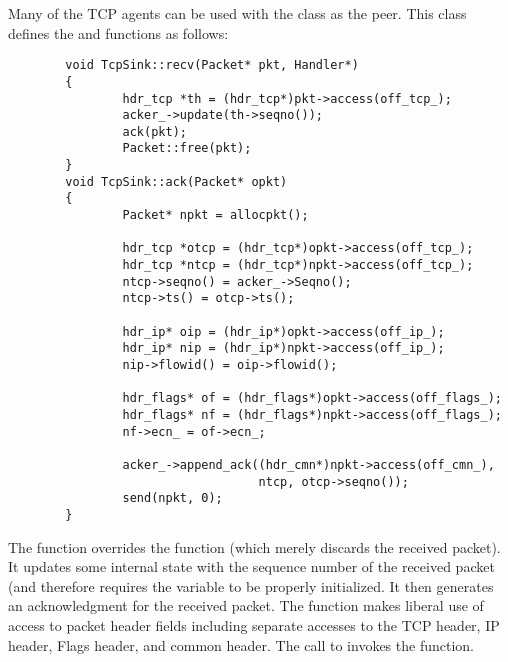 Many of the TCP agents can be used with the  class
as the peer.
This class defines the  and  functions as follows:
\begin{small}
\begin{verbatim}
        void TcpSink::recv(Packet* pkt, Handler*)
        {
                hdr_tcp *th = (hdr_tcp*)pkt->access(off_tcp_);
                acker_->update(th->seqno());
                ack(pkt);
                Packet::free(pkt);
        }
        void TcpSink::ack(Packet* opkt)
        {
                Packet* npkt = allocpkt();
        
                hdr_tcp *otcp = (hdr_tcp*)opkt->access(off_tcp_);
                hdr_tcp *ntcp = (hdr_tcp*)npkt->access(off_tcp_);
                ntcp->seqno() = acker_->Seqno();
                ntcp->ts() = otcp->ts();
        
                hdr_ip* oip = (hdr_ip*)opkt->access(off_ip_);
                hdr_ip* nip = (hdr_ip*)npkt->access(off_ip_);
                nip->flowid() = oip->flowid();
        
                hdr_flags* of = (hdr_flags*)opkt->access(off_flags_);
                hdr_flags* nf = (hdr_flags*)npkt->access(off_flags_);
                nf->ecn_ = of->ecn_;
        
                acker_->append_ack((hdr_cmn*)npkt->access(off_cmn_),
                                   ntcp, otcp->seqno());
                send(npkt, 0);
        }
\end{verbatim}
\end{small}
The  function overrides the  function
(which merely discards the received packet).
It updates some internal state with the sequence number of the
received packet (and therefore requires the  variable
to be properly initialized.
It then generates an acknowledgment for the received packet.
The  function makes liberal use of access to packet header
fields including separate accesses to the TCP header, IP header,
Flags header, and common header.
The call to  invokes the  function.

\subsubsection{}


